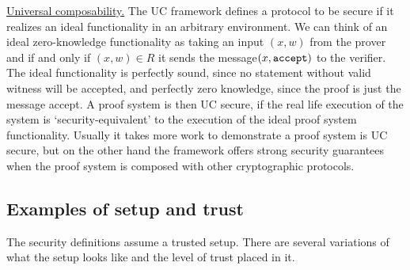 \underline{Universal composability.} The UC framework defines a protocol to be secure if it realizes an ideal functionality in an arbitrary environment. We can think of an ideal zero-knowledge functionality as taking an input $(x,w)$ from the prover and if and only if $(x,w) \in R$ it sends the message$ (x, \tt accept)$ to the verifier. The ideal functionality is perfectly sound, since no statement without valid witness will be accepted, and perfectly zero knowledge, since the proof is just the message accept. A proof system is then UC secure, if the real life execution of the system is `security-equivalent’ to the execution of the ideal proof system functionality. Usually it takes more work to demonstrate a proof system is UC secure, but on the other hand the framework offers strong security guarantees when the proof system is composed with other cryptographic protocols.


\subsection{Examples of setup and trust}
\label{sec:security:defs-props:examples-of-setup-and-trust}

The security definitions assume a trusted setup. There are several variations of what the setup looks like and the level of trust placed in it.

